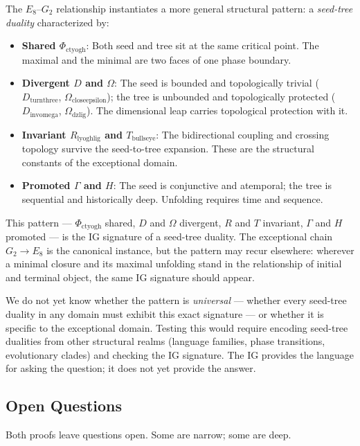 \documentclass[12pt,a4paper]{article}
\begin{document}
The $E_8$--$G_2$ relationship instantiates a more general structural pattern: a \emph{seed-tree duality} characterized by:

\begin{itemize}
    \item \textbf{Shared $\Phi_{\text{ctyogh}}$}: Both seed and tree sit at the same critical point. The maximal and the minimal are two faces of one phase boundary.
    \item \textbf{Divergent $D$ and $\Omega$}: The seed is bounded and topologically trivial ($D_{\text{turnthree}}$, $\Omega_{\text{closeepsilon}}$); the tree is unbounded and topologically protected ($D_{\text{invomega}}$, $\Omega_{\text{dzlig}}$). The dimensional leap carries topological protection with it.
    \item \textbf{Invariant $R_{\text{lyoghlig}}$ and $T_{\text{bullseye}}$}: The bidirectional coupling and crossing topology survive the seed-to-tree expansion. These are the structural constants of the exceptional domain.
    \item \textbf{Promoted $\Gamma$ and $H$}: The seed is conjunctive and atemporal; the tree is sequential and historically deep. Unfolding requires time and sequence.
\end{itemize}

This pattern --- $\Phi_{\text{ctyogh}}$ shared, $D$ and $\Omega$ divergent, $R$ and $T$ invariant, $\Gamma$ and $H$ promoted --- is the IG signature of a seed-tree duality. The exceptional chain $G_2 \to E_8$ is the canonical instance, but the pattern may recur elsewhere: wherever a minimal closure and its maximal unfolding stand in the relationship of initial and terminal object, the same IG signature should appear.

We do not yet know whether the pattern is \emph{universal} --- whether every seed-tree duality in any domain must exhibit this exact signature --- or whether it is specific to the exceptional domain. Testing this would require encoding seed-tree dualities from other structural realms (language families, phase transitions, evolutionary clades) and checking the IG signature. The IG provides the language for asking the question; it does not yet provide the answer.

\subsection{Open Questions}

Both proofs leave questions open. Some are narrow; some are deep.
\end{document}
